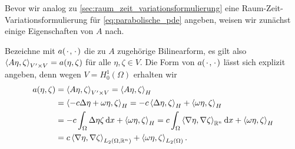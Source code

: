 Bevor wir analog zu \autoref{sec:raum_zeit_variationsformulierung} eine Raum-Zeit-Variationsformulierung für \eqref{eq:parabolische_pde} angeben, weisen wir zunächst einige Eigenschaften von $A$ nach.

Bezeichne mit $a({\mkern2mu\cdot\mkern2mu}, {\mkern2mu\cdot\mkern2mu})$ die zu $A$ zugehörige Bilinearform, es gilt also $\left\langle A \eta,\zeta\right\rangle_{V' \times V} = a(\eta, \zeta)$ für alle $\eta, \zeta \in V$.
Die Form von $a({\mkern2mu\cdot\mkern2mu}, {\mkern2mu\cdot\mkern2mu})$ lässt sich explizit angeben, denn wegen $V = H^{1}_{0}(\Omega)$ erhalten wir
\begin{equation}
    \label{eq:bf_a}
    \begin{aligned}
        a(\eta, \zeta)
        &= \left\langle A \eta,\zeta\right\rangle_{V' \times V}
        = \left\langle A \eta,\zeta\right\rangle_{H}
        \\&= \left\langle- c \Delta \eta + \omega \eta,\zeta\right\rangle_{H}
        = - c \left\langle\Delta \eta,\zeta\right\rangle_{H} + \left\langle\omega \eta,\zeta\right\rangle_{H}
        \\&= -c \int_{\Omega} \Delta \eta \zeta \mathop{}\!\mathrm{d} x + \left\langle\omega \eta,\zeta\right\rangle_{H}
        = c \int_{\Omega} \left\langle\nabla \eta,\nabla \zeta\right\rangle_{\mathbb{R}^{n}} \mathop{}\!\mathrm{d} x + \left\langle\omega \eta,\zeta\right\rangle_{H}
        \\&= c \left\langle\nabla \eta,\nabla \zeta\right\rangle_{L_{2}(\Omega, \mathbb{R}^{n})} + \left\langle\omega \eta,\zeta\right\rangle_{L_{2}(\Omega)}.
    \end{aligned}
\end{equation}


